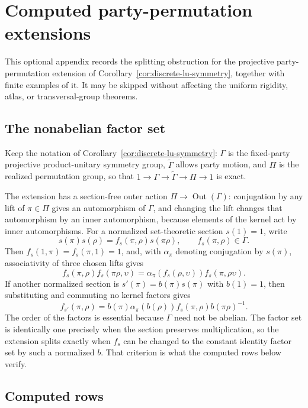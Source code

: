 \section{Computed party-permutation extensions}
\label{sec:party-extensions}

This optional appendix records the splitting obstruction for the projective
party-permutation extension of Corollary~\ref{cor:discrete-lu-symmetry},
together with finite examples of it.  It may be skipped without affecting
the uniform rigidity, atlas, or transversal-group theorems.

\subsection*{The nonabelian factor set}

Keep the notation of Corollary~\ref{cor:discrete-lu-symmetry}: \(\Gamma\)
is the fixed-party projective product-unitary symmetry group,
\(\widetilde\Gamma\) allows party motion, and \(\Pi\) is the realized
permutation group, so that
\(1\to\Gamma\to\widetilde\Gamma\to\Pi\to1\) is exact.

The extension has a section-free outer action
\(\Pi\to\operatorname{Out}(\Gamma)\): conjugation by any lift of
\(\pi\in\Pi\) gives an automorphism of \(\Gamma\), and changing the lift
changes that automorphism by an inner automorphism, because elements of the
kernel act by inner automorphisms.  For a normalized set-theoretic section
\(s(1)=1\), write
\[
  s(\pi)s(\rho)
    =f_s(\pi,\rho)s(\pi\rho),\qquad f_s(\pi,\rho)\in\Gamma .
\]
Then \(f_s(1,\pi)=f_s(\pi,1)=1\), and, with \(\alpha_\pi\) denoting
conjugation by \(s(\pi)\), associativity of three chosen lifts gives
\[
 f_s(\pi,\rho)f_s(\pi\rho,\upsilon)
 =\alpha_\pi\!\left(f_s(\rho,\upsilon)\right)
   f_s(\pi,\rho\upsilon).
\]
If another normalized section is \(s'(\pi)=b(\pi)s(\pi)\) with
\(b(1)=1\), then substituting and commuting no kernel factors gives
\[
 f_{s'}(\pi,\rho)
 =b(\pi)\alpha_\pi\!\left(b(\rho)\right)
   f_s(\pi,\rho)b(\pi\rho)^{-1}.
\]
The order of the factors is essential because \(\Gamma\) need not be
abelian.  The factor set is identically one precisely when the section
preserves multiplication, so the extension splits exactly when \(f_s\) can
be changed to the constant identity factor set by such a normalized \(b\).
That criterion is what the computed rows below verify.

\subsection*{Computed rows}

